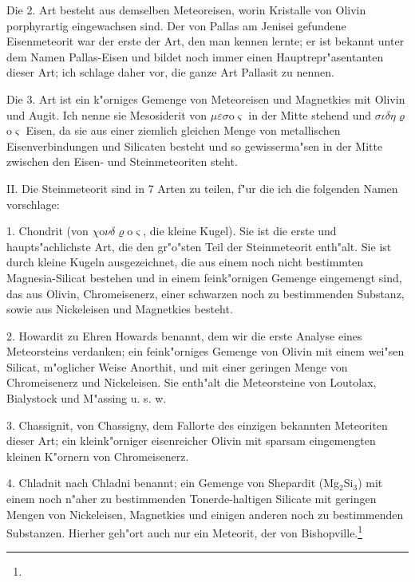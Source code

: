 \documentclass[a4paper, 11pt, oneside]{article}
\begin{document}
Die 2. Art besteht aus demselben Meteoreisen, worin Kristalle von Olivin porphyrartig eingewachsen sind. Der von Pallas am Jenisei gefundene Eisenmeteorit war der erste der Art, den man kennen lernte; er ist bekannt unter dem Namen Pallas-Eisen und bildet noch immer einen Hauptrepr"asentanten dieser Art; ich schlage daher vor, die ganze Art Pallasit zu nennen.

Die 3. Art ist ein k"orniges Gemenge von Meteoreisen und Magnetkies mit Olivin und Augit. Ich nenne sie Mesosiderit von $\mu\varepsilon\sigma$o$\varsigma$ in der Mitte stehend und $\sigma\iota\delta\eta\varrho$o$\varsigma$ Eisen, da sie aus einer ziemlich gleichen Menge von metallischen Eisenverbindungen und Silicaten besteht und so gewisserma"sen in der Mitte zwischen den Eisen- und Steinmeteoriten steht.

II. Die Steinmeteorit sind in 7 Arten zu teilen, f"ur die ich die folgenden Namen vorschlage:

1. Chondrit (von $\chi$o$\nu\delta\varrho$o$\varsigma$, die kleine Kugel). Sie ist die erste und haupts"achlichste Art, die den gr"o"sten Teil der Steinmeteorit enth"alt. Sie ist durch kleine Kugeln ausgezeichnet, die aus einem noch nicht bestimmten Magnesia-Silicat bestehen und in einem feink"ornigen Gemenge eingemengt sind, das aus Olivin, Chromeisenerz, einer schwarzen noch zu bestimmenden Substanz, sowie aus Nickeleisen und Magnetkies besteht.

2. Howardit zu Ehren Howards benannt, dem wir die erste Analyse eines Meteorsteins verdanken; ein feink"orniges Gemenge von Olivin mit einem wei"sen Silicat, m"oglicher Weise Anorthit, und mit einer geringen Menge von Chromeisenerz und Nickeleisen. Sie enth"alt die Meteorsteine von Loutolax, Bialystock und M"assing u. s. w.

3. Chassignit, von Chassigny, dem Fallorte des einzigen bekannten Meteoriten dieser Art; ein kleink"orniger eisenreicher Olivin mit sparsam eingemengten kleinen K"ornern von Chromeisenerz.

4. Chladnit nach Chladni benannt; ein Gemenge von Shepardit (Mg$_{2}$Si$_{3}$) mit einem noch n"aher zu bestimmenden Tonerde-haltigen Silicate mit geringen Mengen von Nickeleisen, Magnetkies und einigen anderen noch zu bestimmenden Substanzen. Hierher geh"ort auch nur ein Meteorit, der von Bishopville.\footnote{}
\end{document}

